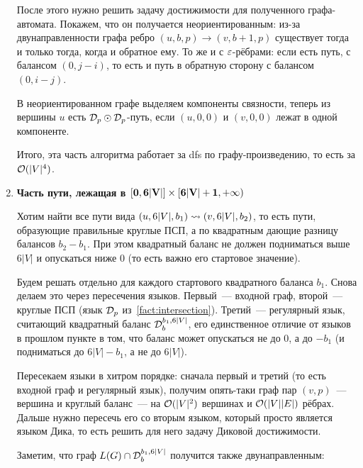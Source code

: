 \begin{enumerate}
    После этого нужно решить задачу достижимости для полученного графа-автомата. Покажем, что он получается неориентированным: из-за двунаправленности графа ребро $(u, b, p) \to (v, b+1, p)$ существует тогда и только тогда, когда и обратное ему. То же и с $\varepsilon$-рёбрами: если есть путь, с балансом $(0, j-i)$, то есть и путь в обратную сторону с балансом $(0, i-j)$.

    В неориентированном графе выделяем компоненты связности, теперь из вершины $u$ есть $\mathcal{D}_p \odot \mathcal{D}_p$-путь, если $(u, 0, 0)$ и $(v, 0, 0)$ лежат в одной компоненте.

    Итого, эта часть алгоритма работает за dfs по графу-произведению, то есть за $\mathcal{O}(|V|^4)$.

    \item {\bf Часть пути, лежащая в $\mathbf{[0, 6|V|] \times [6|V| + 1, +\infty)}$}

    Хотим найти все пути вида $(u, 6|V|, b_1) \rightsquigarrow (v, 6|V|, b_2)$, то есть пути, образующие правильные круглые ПСП, а по квадратным дающие разницу балансов $b_2 - b_1$. При этом квадратный баланс не должен подниматься выше $6|V|$ и опускаться ниже 0 (то есть важно его стартовое значение).

    Будем решать отдельно для каждого стартового квадратного баланса $b_1$. Снова делаем это через пересечения языков. Первый~--- входной граф, второй~--- круглые ПСП (язык $\mathcal{D}_p$ из~\ref{fact:intersection}). Третий~--- регулярный язык, считающий квадратный баланс $\mathcal{D}_b^{b_1, 6|V|}$, его единственное отличие от языков в прошлом пункте в том, что баланс может опускаться не до 0, а до $-b_1$ (и подниматься до $6|V| - b_1$, а не до $6|V|$).

    Пересекаем языки в хитром порядке: сначала первый и третий (то есть входной граф и регулярный язык), получим опять-таки граф пар $(v, p)$~--- вершина и круглый баланс~--- на $\mathcal{O}(|V|^2)$ вершинах и $\mathcal{O}(|V||E|)$ рёбрах. Дальше нужно пересечь его со вторым языком, который просто является языком Дика, то есть решить для него задачу Диковой достижимости.

    Заметим, что граф $L(G) \cap \mathcal{D}_b^{b_1, 6|V|}$ получится также двунаправленным:


\end{enumerate}
